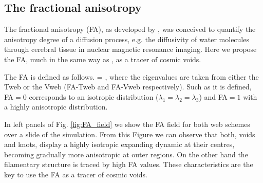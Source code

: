 \documentclass[a4,useAMS,usenatbib,usegraphicx]{latex/mn2e}
\begin{document}
\subsection{The fractional anisotropy}
\label{subsec:FA_voids}


The fractional anisotropy (FA), as developed by \citet{Basser95}, was 
conceived to quantify the anisotropy degree of a diffusion process, e.g. 
the diffusivity of water molecules through cerebral tissue in nuclear
magnetic resonance imaging. 
Here we propose the FA, much in the same way as \citet{Libeskind13},
as a tracer of cosmic voids. 


The FA is defined as follows.
{{} = ,}
where the eigenvalues are taken from either the Tweb or the Vweb 
(FA-Tweb and FA-Vweb respectively). Such as it is defined, FA$=0$ 
corresponds to an isotropic distribution ($\lambda_1=\lambda_2=\lambda_3$) 
and FA$=1$ with a highly anisotropic distribution.


In left panels of Fig. \ref{fig:FA_field} we show the FA field for both 
web schemes over a slide of the simulation. 
From this Figure we can observe that both, voids and knots, display a highly 
isotropic expanding dynamic at their centres, becoming gradually more
anisotropic at outer regions. 
On the other hand the filamentary structure is traced by high FA
values. These characteristics are the key to use the FA as a tracer of
cosmic voids. 
\end{document}
